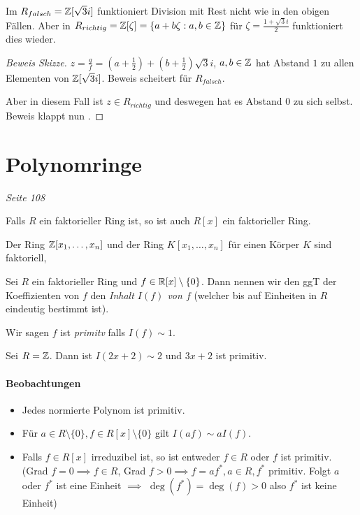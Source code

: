 \begin{theorem}
	Im $R_{falsch} = \mathbb{Z}[\sqrt{3}i]$ funktioniert Division mit Rest nicht wie in den obigen Fällen.
	Aber in $R_{richtig} = \mathbb{Z}[\zeta] = \{a+b \zeta : a,b \in \mathbb{Z}\} $ für $\zeta = \frac{1+\sqrt{3} i}{2}$ funktioniert dies wieder.
\end{theorem}

\begin{proof}[Beweis Skizze]

$z = \frac{g}{f} = (a+\frac{1}{2}) + (b+\frac{1}{2}) \sqrt{3} i$, $a,b \in \mathbb{Z}$ hat Abstand $1$ zu allen Elementen von $\mathbb{Z}[\sqrt{3}i]$.
Beweis scheitert für $R_{falsch}$.

Aber in diesem Fall ist $z \in R_{richtig}$ und deswegen hat es Abstand $0$ zu sich selbst. Beweis klappt nun .

\end{proof}



\section{Polynomringe}
\emph{Seite 108}

\begin{theorem}[Gauss]
	Falls $R$ ein faktorieller Ring ist, so ist auch $R[x]$ ein faktorieller Ring.
\end{theorem}

\begin{corollary}
	Der Ring $\mathbb{Z}[x_1,\ldots,x_{n}]$ und der Ring $K[x_1,\ldots,x_{n}]$ für einen Körper $K$ sind faktoriell,
\end{corollary}

\begin{definition}
	Sei $R$ ein faktorieller Ring und $f \in \mathbb{R}[x] \setminus \{0\}$.
	Dann nennen wir den ggT der Koeffizienten von $f$ den \emph{Inhalt $I(f)$ von $f$ }
	(welcher bis auf Einheiten in $R$ eindeutig bestimmt ist).

	Wir sagen $f$ ist \emph{primitv} falls $I(f) \sim 1$.
\end{definition}

\begin{eg}
	Sei $R = \mathbb{Z}$. Dann ist $I(2x+2) \sim 2$ und  $3x+2$ ist primitiv.
\end{eg}

\paragraph{Beobachtungen}
\begin{itemize}
	\item Jedes normierte Polynom ist primitiv.
	\item Für $a \in R \setminus \{0\}, f \in R[x] \setminus \{0\} $ gilt $I(af) \sim a I(f)$.
	\item Falls  $f \in R[x]$ irreduzibel ist, so ist entweder
		$f \in R$ oder $f$ ist primitiv.
		(Grad $f = 0 \implies f \in R$, Grad $f > 0 \implies f = a f^{*}, a \in R, f^{*}$ primitiv.
		Folgt $a$ oder $f^{*}$ ist eine Einheit $\implies$ $\deg(f^{*}) = \deg(f) > 0$ also $f^{*}$ ist keine Einheit)
\end{itemize}

